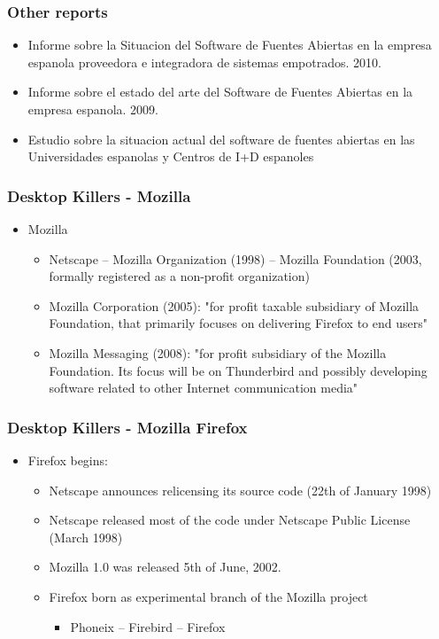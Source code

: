 \documentclass{beamer}
\begin{document}
\begin{frame}
\frametitle{Other reports}

\begin{itemize}
\item Informe sobre la Situacion del Software de Fuentes Abiertas en la empresa espanola proveedora e integradora de sistemas empotrados. 2010.
\item Informe sobre el estado del arte del Software de Fuentes Abiertas en la empresa espanola. 2009. 
\item Estudio sobre la situacion actual del software de fuentes abiertas en las Universidades espanolas y Centros de I+D espanoles 

\end{itemize}

\end{frame}





\begin{frame}
\frametitle{Desktop Killers - Mozilla}

\begin{itemize}
\item Mozilla
	\begin{itemize}
	\item Netscape --  Mozilla Organization (1998) -- Mozilla Foundation (2003, formally registered as a non-profit organization)
	\item Mozilla Corporation (2005): "for profit taxable subsidiary of Mozilla Foundation, that primarily focuses on delivering Firefox to end users"
	\item Mozilla Messaging (2008): "for profit subsidiary of the Mozilla Foundation. Its focus will be on Thunderbird and possibly developing software related to other Internet communication media"
	\end{itemize}

\end{itemize}
\end{frame}


\begin{frame}
\frametitle{Desktop Killers - Mozilla Firefox}

\begin{itemize}
\item Firefox begins:
	\begin{itemize}
	\item Netscape announces relicensing its source code (22th of January 1998)
	\item Netscape released most of the code under Netscape Public License (March 1998)
	\item Mozilla 1.0 was released 5th of June, 2002.
	\item Firefox born as experimental branch of the Mozilla project
		\begin {itemize}
		\item Phoneix -- Firebird -- Firefox
		\end {itemize}
	\end{itemize}
\end{itemize}

\end{frame}
\end{document}

